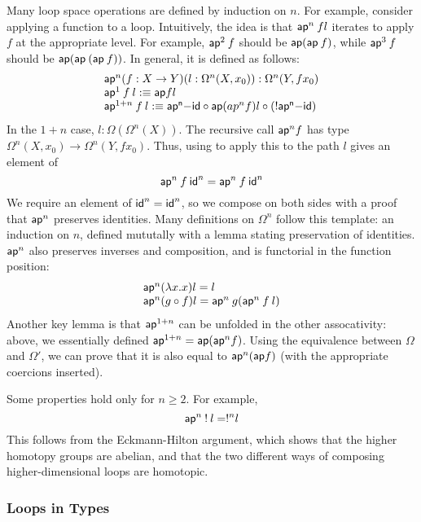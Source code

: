 Many loop space operations are  defined by induction on $n$.  For
example, consider applying a function to a loop.  Intuitively, the idea
is that $\mathsf{ap}^n \: f l$ iterates  to apply $f$ at the
appropriate level.  For example, $\mathsf{ap}^2 \: f$ should be $\mathsf{ap}
(\mathsf{ap} \: f)$, while $\mathsf{ap}^3 \: f$ should be $\mathsf{ap}
(\mathsf{ap} \: (\mathsf{ap} \: f))$.  In general, it is defined as follows:
\[
\begin{array}{l}
\mathsf{ap}^n (f : X \to Y) (l : \Omega^n(X,x_0)) : \Omega^n(Y,f x_0) \\
\mathsf{ap}^1 \: f \: l :\equiv \mathsf{ap} f l \\
\mathsf{ap}^{1+n} \: f \: l :\equiv \mathsf{ap^n\mathord{-}id } \mathbin{\circ} \mathsf{ap} (ap^n f) l \mathbin{\circ} (! \mathsf{ap^n\mathord{-}id }) \\
\end{array}
\]
In the $1+n$ case, $l : \Omega(\Omega^n(X))$.  The recursive call
$\mathsf{ap}^n f$ has type $\Omega^n(X,x_0) \to \Omega^n(Y, f x_0)$.  Thus, 
using  to apply this to the path $l$ gives an element of 
\[
\mathsf{ap}^n \: f \: \mathsf{id}^n = \mathsf{ap}^n \: f \: \mathsf{id}^n
\]
We require an element of $\mathsf{id}^{n} = \mathsf{id}^n$, so we compose on
both sides with a proof  that $\mathsf{ap}^n$
preserves identities.  Many definitions on $\Omega^n$ follow this
template: an induction on $n$, defined mututally with a lemma stating
preservation of identities.  $\mathsf{ap}^n$ also preserves inverses and
composition, and is functorial in the function position:
\[
\begin{array}{l}
\mathsf{ap}^n(\lambda x.x) l = l \\
\mathsf{ap}^n(g \mathbin{\circ} f) l = \mathsf{ap}^n \: g (\mathsf{ap}^n \: f \: l) 
\end{array}
\]
Another key lemma is that $\mathsf{ap}^{1+n}$ can be unfolded in the other
assocativity: above, we essentially defined $\mathsf{ap}^{1+n} =
\mathsf{ap}(\mathsf{ap}^n f)$.  Using the equivalence between $\Omega$ and
$\Omega'$, we can prove that it is also equal to $\mathsf{ap}^n(\mathsf{ap}
f)$ (with the appropriate coercions inserted).   

Some properties hold only for $n\ge2$.  For example, 
\[
\mathsf{ap}^n \: ! \: l = !^n l 
\]
This follows from the Eckmann-Hilton argument, which shows that the
higher homotopy groups are abelian, and that the two different ways of
composing higher-dimensional loops are homotopic.  

\subsubsection{Loops in Types}


